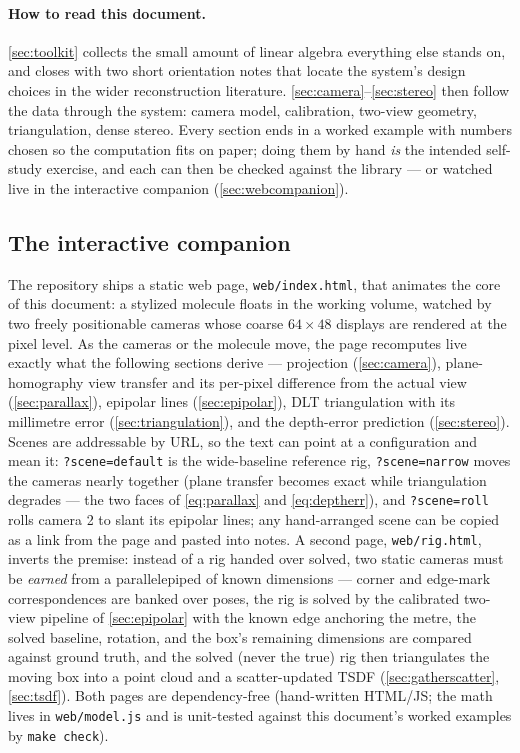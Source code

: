 \documentclass[11pt]{article}
\theoremstyle{definition}
\newcommand{\code}[1]{\texttt{#1}}
\begin{document}
\paragraph{How to read this document.} \autoref{sec:toolkit} collects the
small amount of linear algebra everything else stands on, and closes with
two short orientation notes that locate the system's design choices in the
wider reconstruction literature.
\autoref{sec:camera}--\autoref{sec:stereo} then follow the data through the
system: camera model, calibration, two-view geometry, triangulation, dense
stereo. Every section ends in a worked example with numbers chosen so the
computation fits on paper; doing them by hand \emph{is} the intended
self-study exercise, and each can then be checked against the library
--- or watched live in the interactive companion
(\autoref{sec:webcompanion}).

\subsection{The interactive companion}
\label{sec:webcompanion}

The repository ships a static web page, \code{web/index.html}, that
animates the core of this document: a stylized molecule floats in the
working volume, watched by two freely positionable cameras whose coarse
$64\times48$ displays are rendered at the pixel level. As the cameras
or the molecule move, the page recomputes live exactly what the
following sections derive --- projection (\autoref{sec:camera}),
plane-homography view transfer and its per-pixel difference from the
actual view (\autoref{sec:parallax}), epipolar lines
(\autoref{sec:epipolar}), DLT triangulation with its millimetre error
(\autoref{sec:triangulation}), and the depth-error prediction
(\autoref{sec:stereo}). Scenes are addressable by URL, so the text can
point at a configuration and mean it: \code{?scene=default} is the
wide-baseline reference rig, \code{?scene=narrow} moves the cameras
nearly together (plane transfer becomes exact while triangulation
degrades --- the two faces of \eqref{eq:parallax} and
\eqref{eq:deptherr}), and \code{?scene=roll} rolls camera 2 to slant
its epipolar lines; any hand-arranged scene can be copied as a link
from the page and pasted into notes. A second page,
\code{web/rig.html}, inverts the premise: instead of a rig handed over
solved, two static cameras must be \emph{earned} from a parallelepiped
of known dimensions --- corner and edge-mark correspondences are banked
over poses, the rig is solved by the calibrated two-view pipeline of
\autoref{sec:epipolar} with the known edge anchoring the metre, the
solved baseline, rotation, and the box's remaining dimensions are
compared against ground truth, and the solved (never the true) rig then
triangulates the moving box into a point cloud and a scatter-updated
TSDF (\autoref{sec:gatherscatter}, \autoref{sec:tsdf}). Both pages are
dependency-free
(hand-written HTML/JS; the math lives in \code{web/model.js} and is
unit-tested against this document's worked examples by
\code{make check}).
\end{document}
